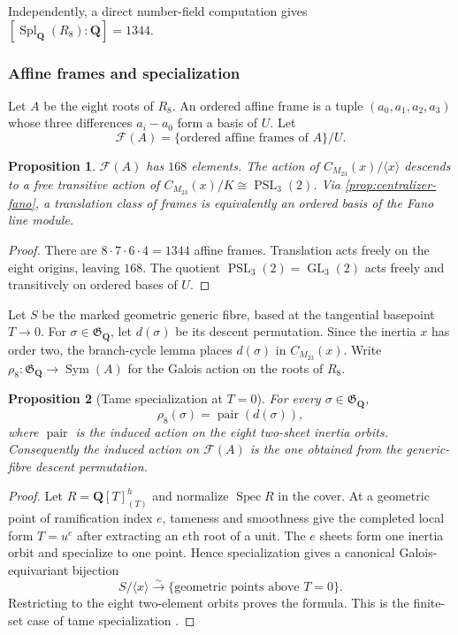 \documentclass[11pt]{amsart}
\newtheorem{proposition}[proposition]{Proposition}
\theoremstyle{definition}
\theoremstyle{remark}
\newcommand{\QQ}{\mathbf Q}
\newcommand{\PSL}{\operatorname{PSL}}
\newcommand{\Spl}{\operatorname{Spl}}
\newcommand{\Sym}{\operatorname{Sym}}
\newcommand{\GQ}{\mathfrak G_{\QQ}}
\newcommand{\Cx}{C_{M_{23}}(x)}
\begin{document}
Independently, a direct number-field computation gives
$[\Spl_{\QQ}(R_8):\QQ]=1344$.

\subsubsection{Affine frames and specialization}

Let $A$ be the eight roots of $R_8$.  An ordered affine frame is a tuple
$(a_0,a_1,a_2,a_3)$ whose three differences $a_i-a_0$ form a basis of $U$.
Let
\[
 \mathcal F(A)=\{\text{ordered affine frames of }A\}/U.
\]

\begin{proposition}\label{prop:affineframes}
$\mathcal F(A)$ has $168$ elements.  The action of
$\Cx/\langle x\rangle$ descends to a free transitive action of
$\Cx/K\cong\PSL_3(2)$.  Via \cref{prop:centralizer-fano}, a translation
class of frames is equivalently an ordered basis of the Fano line module.
\end{proposition}

\begin{proof}
There are $8\cdot7\cdot6\cdot4=1344$ affine frames.  Translation acts
freely on the eight origins, leaving $168$.  The quotient
$\PSL_3(2)=\operatorname{GL}_3(2)$ acts freely and transitively on ordered
bases of $U$.
\end{proof}

Let $S$ be the marked geometric generic fibre, based at the tangential
basepoint $T\to0$.  For $\sigma\in\GQ$, let $d(\sigma)$ be its descent
permutation.  Since the inertia $x$ has order two, the branch-cycle lemma
places $d(\sigma)$ in $\Cx$.  Write
$\rho_8:\GQ\to\Sym(A)$ for the Galois action on the roots of $R_8$.

\begin{proposition}[Tame specialization at $T=0$]
\label{prop:specialization}
For every $\sigma\in\GQ$,
\[
 \rho_8(\sigma)=\operatorname{pair}(d(\sigma)),
\]
where $\operatorname{pair}$ is the induced action on the eight two-sheet
inertia orbits.  Consequently the induced action on $\mathcal F(A)$ is the
one obtained from the generic-fibre descent permutation.
\end{proposition}

\begin{proof}
Let $R=\QQ[T]_{(T)}^h$ and normalize $\operatorname{Spec}R$ in the cover.
At a geometric point of ramification index $e$, tameness and smoothness give
the completed local form $T=u^e$ after extracting an $e$th root of a unit.
The $e$ sheets form one inertia orbit and specialize to one point.  Hence
specialization gives a canonical Galois-equivariant bijection
\[
 S/\langle x\rangle\xrightarrow{\sim}
 \{\text{geometric points above }T=0\}.
\]
Restricting to the eight two-element orbits proves the formula.  This is the
finite-set case of tame specialization
\cite[Expos\'e XIII, Section~2.10]{SGA1}.
\end{proof}
\end{document}
